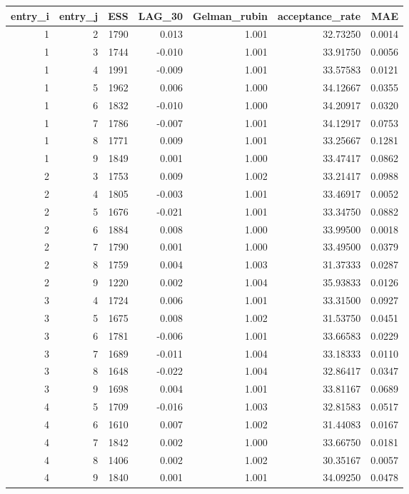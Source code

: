 \begin{longtable}{rrrrrrr}
\toprule
entry\_i & entry\_j & ESS & LAG\_30 & Gelman\_rubin & acceptance\_rate & MAE \\ 
\midrule
1 & 2 & 1790 & 0.013 & 1.001 & 32.73250 & 0.0014 \\ 
1 & 3 & 1744 & -0.010 & 1.001 & 33.91750 & 0.0056 \\ 
1 & 4 & 1991 & -0.009 & 1.001 & 33.57583 & 0.0121 \\ 
1 & 5 & 1962 & 0.006 & 1.000 & 34.12667 & 0.0355 \\ 
1 & 6 & 1832 & -0.010 & 1.000 & 34.20917 & 0.0320 \\ 
1 & 7 & 1786 & -0.007 & 1.001 & 34.12917 & 0.0753 \\ 
1 & 8 & 1771 & 0.009 & 1.001 & 33.25667 & 0.1281 \\ 
1 & 9 & 1849 & 0.001 & 1.000 & 33.47417 & 0.0862 \\ 
2 & 3 & 1753 & 0.009 & 1.002 & 33.21417 & 0.0988 \\ 
2 & 4 & 1805 & -0.003 & 1.001 & 33.46917 & 0.0052 \\ 
2 & 5 & 1676 & -0.021 & 1.001 & 33.34750 & 0.0882 \\ 
2 & 6 & 1884 & 0.008 & 1.000 & 33.99500 & 0.0018 \\ 
2 & 7 & 1790 & 0.001 & 1.000 & 33.49500 & 0.0379 \\ 
2 & 8 & 1759 & 0.004 & 1.003 & 31.37333 & 0.0287 \\ 
2 & 9 & 1220 & 0.002 & 1.004 & 35.93833 & 0.0126 \\ 
3 & 4 & 1724 & 0.006 & 1.001 & 33.31500 & 0.0927 \\ 
3 & 5 & 1675 & 0.008 & 1.002 & 31.53750 & 0.0451 \\ 
3 & 6 & 1781 & -0.006 & 1.001 & 33.66583 & 0.0229 \\ 
3 & 7 & 1689 & -0.011 & 1.004 & 33.18333 & 0.0110 \\ 
3 & 8 & 1648 & -0.022 & 1.004 & 32.86417 & 0.0347 \\ 
3 & 9 & 1698 & 0.004 & 1.001 & 33.81167 & 0.0689 \\ 
4 & 5 & 1709 & -0.016 & 1.003 & 32.81583 & 0.0517 \\ 
4 & 6 & 1610 & 0.007 & 1.002 & 31.44083 & 0.0167 \\ 
4 & 7 & 1842 & 0.002 & 1.000 & 33.66750 & 0.0181 \\ 
4 & 8 & 1406 & 0.002 & 1.002 & 30.35167 & 0.0057 \\ 
4 & 9 & 1840 & 0.001 & 1.001 & 34.09250 & 0.0478 \\ 

\end{longtable}
